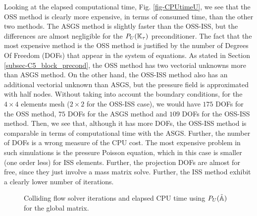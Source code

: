 Looking at the elapsed computational time, Fig. \ref{fig-CPUtimeU}, we see that the OSS method is clearly more expensive, in terms of consumed time, than the other two methods. The ASGS method is slightly faster than the OSS-ISS, but the differences are almost negligible for the $P_U(\mathbb{K}_\tau)$ preconditioner. The fact that the most expensive method is the OSS method is justified by the number of Degrees Of Freedom (DOFs) that appear in the system of equations. As stated in Section \ref{subsec-C5_block_precond}, the OSS method has two vectorial unknowns more than ASGS method. On the other hand, the OSS-ISS method also has an additional vectorial unknown than ASGS, but the pressure field is approximated with half nodes. Without taking into account the boundary conditions, for the $4\times4$ elements mesh ($2\times2$ for the OSS-ISS case), we would have $175$ DOFs for the OSS method, $75$ DOFs for the ASGS method and $109$ DOFs for the OSS-ISS method. Then, we see that, although it has more DOFs, the OSS-ISS method is comparable in terms of computational time with the ASGS. Further, the number of DOFs is a wrong measure of the CPU cost. The most expensive problem in such simulations is the pressure Poisson equation, which in this case is smaller (one order less) for ISS elements. Further, the projection DOFs are almost for free, since they just involve a mass matrix solve. Further, the ISS method exhibit a clearly lower number of iterations.
\begin{figure}[h!]
  \centering
  \caption{Colliding flow solver iterations and elapsed CPU time using $P_U(\tilde{\mathbb{A}})$ for the global matrix.}
  \label{fig-soliter-CPUtime}
\end{figure}

